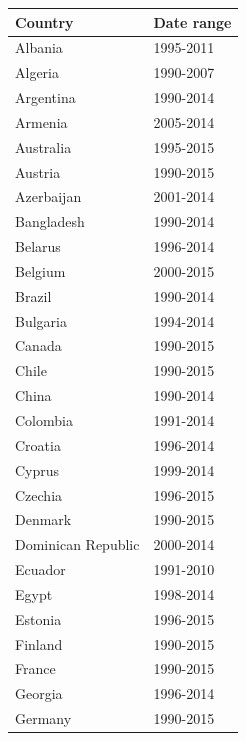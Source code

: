 \documentclass[12pt,a4paper]{article}
\begin{document}
\renewcommand{\arraystretch}{1}
\begin{table}[htbp]
\centering
\begin{subtable}{0.45\textwidth}
\centering
\begin{tabular}{ll}
\toprule
   Country & Date range \\
\midrule
                   Albania &  1995-2011 \\
                   Algeria &  1990-2007 \\
                 Argentina &  1990-2014 \\
                   Armenia &  2005-2014 \\
                 Australia &  1995-2015 \\
                   Austria &  1990-2015 \\
                Azerbaijan &  2001-2014 \\
                Bangladesh &  1990-2014 \\
                   Belarus &  1996-2014 \\
                   Belgium &  2000-2015 \\
                    Brazil &  1990-2014 \\
                  Bulgaria &  1994-2014 \\
                    Canada &  1990-2015 \\
                     Chile &  1990-2015 \\
                     China &  1990-2014 \\
                  Colombia &  1991-2014 \\
                   Croatia &  1996-2014 \\
                    Cyprus &  1999-2014 \\
                   Czechia &  1996-2015 \\
                   Denmark &  1990-2015 \\
        Dominican Republic &  2000-2014 \\
                   Ecuador &  1991-2010 \\
                     Egypt &  1998-2014 \\
                   Estonia &  1996-2015 \\
                   Finland &  1990-2015 \\
                    France &  1990-2015 \\
                   Georgia &  1996-2014 \\
                   Germany &  1990-2015 \\

\end{tabular}
\end{subtable}
\end{table}
\end{document}
